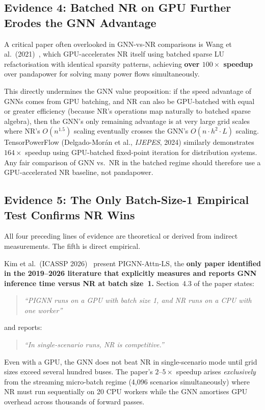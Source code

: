 \documentclass[11pt]{article}
\begin{document}
\subsection{Evidence 4: Batched NR on GPU Further Erodes the GNN Advantage}

A critical paper often overlooked in GNN-vs-NR comparisons is
Wang et al.\ (2021)~\cite{Wang2021GPU}, which GPU-accelerates NR itself
using batched sparse LU refactorisation with identical sparsity patterns,
achieving \textbf{over $100\times$ speedup} over pandapower for solving
many power flows simultaneously.

This directly undermines the GNN value proposition: if the speed advantage
of GNNs comes from GPU batching, and NR can also be GPU-batched with equal
or greater efficiency (because NR's operations map naturally to batched
sparse algebra), then the GNN's only remaining advantage is at very large
grid scales where NR's $O(n^{1.5})$ scaling eventually crosses the GNN's
$O(n \cdot h^2 \cdot L)$ scaling.  TensorPowerFlow
(Delgado-Mor\'{a}n et al., \textit{IJEPES}, 2024) similarly demonstrates
$164\times$ speedup using GPU-batched fixed-point iteration for distribution
systems.  Any fair comparison of GNN vs.\ NR in the batched regime should
therefore use a GPU-accelerated NR baseline, not pandapower.

\subsection{Evidence 5: The Only Batch-Size-1 Empirical Test Confirms NR Wins}

All four preceding lines of evidence are theoretical or derived from
indirect measurements.  The fifth is direct empirical.

Kim et al.\ (ICASSP 2026)~\cite{Kim2026} present PIGNN-Attn-LS, the
\textbf{only paper identified in the 2019--2026 literature that explicitly
measures and reports GNN inference time versus NR at batch size~1.}
Section~4.3 of the paper states:
\begin{quote}
\textit{``PIGNN runs on a GPU with batch size 1, and NR runs on a CPU
with one worker''}
\end{quote}
and reports:
\begin{quote}
\textit{``In single-scenario runs, NR is competitive.''}
\end{quote}
Even with a GPU, the GNN does not beat NR in single-scenario mode until
grid sizes exceed several hundred buses.  The paper's $2$--$5\times$
speedup arises \emph{exclusively} from the streaming micro-batch regime
(4,096 scenarios simultaneously) where NR must run sequentially on 20 CPU
workers while the GNN amortises GPU overhead across thousands of forward
passes.
\end{document}
